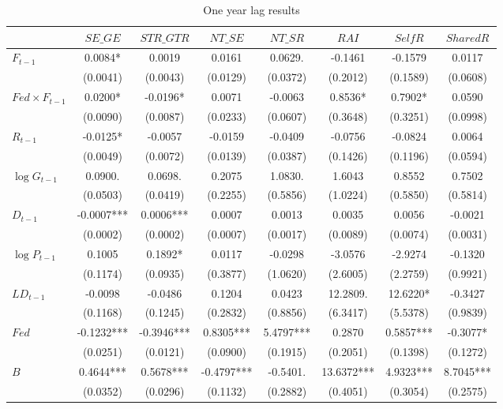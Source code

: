 \begin{table}[!htbp]
\centering
\caption{One year lag results}
\label{tab:cre_lag1_fedxf_nohl}
\small
\setlength{\tabcolsep}{20pt}
\begin{tabular}{lccccccc}
\hline
 & $SE\_GE$ & $STR\_GTR$ & $NT\_SE$ & $NT\_SR$ & $RAI$ & $SelfR$ & $SharedR$ \\
\hline
$F_{t-1}$ & 0.0084* & 0.0019 & 0.0161 & 0.0629. & -0.1461 & -0.1579 & 0.0117 \\
 & (0.0041) & (0.0043) & (0.0129) & (0.0372) & (0.2012) & (0.1589) & (0.0608) \\
$Fed\times F_{t-1}$ & 0.0200* & -0.0196* & 0.0071 & -0.0063 & 0.8536* & 0.7902* & 0.0590 \\
 & (0.0090) & (0.0087) & (0.0233) & (0.0607) & (0.3648) & (0.3251) & (0.0998) \\
$R_{t-1}$ & -0.0125* & -0.0057 & -0.0159 & -0.0409 & -0.0756 & -0.0824 & 0.0064 \\
 & (0.0049) & (0.0072) & (0.0139) & (0.0387) & (0.1426) & (0.1196) & (0.0594) \\
$\log G_{t-1}$ & 0.0900. & 0.0698. & 0.2075 & 1.0830. & 1.6043 & 0.8552 & 0.7502 \\
 & (0.0503) & (0.0419) & (0.2255) & (0.5856) & (1.0224) & (0.5850) & (0.5814) \\
$D_{t-1}$ & -0.0007*** & 0.0006*** & 0.0007 & 0.0013 & 0.0035 & 0.0056 & -0.0021 \\
 & (0.0002) & (0.0002) & (0.0007) & (0.0017) & (0.0089) & (0.0074) & (0.0031) \\
$\log P_{t-1}$ & 0.1005 & 0.1892* & 0.0117 & -0.0298 & -3.0576 & -2.9274 & -0.1320 \\
 & (0.1174) & (0.0935) & (0.3877) & (1.0620) & (2.6005) & (2.2759) & (0.9921) \\
$LD_{t-1}$ & -0.0098 & -0.0486 & 0.1204 & 0.0423 & 12.2809. & 12.6220* & -0.3427 \\
 & (0.1168) & (0.1245) & (0.2832) & (0.8856) & (6.3417) & (5.5378) & (0.9839) \\
$Fed$ & -0.1232*** & -0.3946*** & 0.8305*** & 5.4797*** & 0.2870 & 0.5857*** & -0.3077* \\
 & (0.0251) & (0.0121) & (0.0900) & (0.1915) & (0.2051) & (0.1398) & (0.1272) \\
$B$ & 0.4644*** & 0.5678*** & -0.4797*** & -0.5401. & 13.6372*** & 4.9323*** & 8.7045*** \\
 & (0.0352) & (0.0296) & (0.1132) & (0.2882) & (0.4051) & (0.3054) & (0.2575) \\
\hline

\end{tabular}
\end{table}
